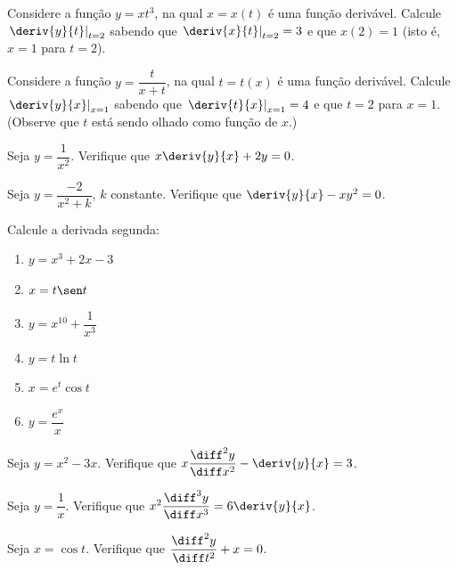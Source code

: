 \begin{exercicio}[4]
Considere a função $y = xt^3$, na qual $x = x(t)$ é uma função derivável. Calcule $\left.\deriv{y}{t}\right|_{t = 2}$ sabendo que $\left.\deriv{x}{t}\right|_{t = 2} = 3$ e que $x(2) = 1$ (isto é, $x = 1$ para $t = 2$).
\end{exercicio}

\begin{exercicio}[5]
Considere a função $y = \dfrac{t}{x + t}$, na qual $t = t(x)$ é uma função derivável. Calcule $\left.\deriv{y}{x}\right|_{x = 1}$ sabendo que $\left.\deriv{t}{x}\right|_{x = 1} = 4$ e que $t = 2$ para $x = 1$. (Observe que $t$ está sendo olhado como função de $x$.)
\end{exercicio}

\begin{exercicio}[6]
Seja $y = \dfrac{1}{x^2}$. Verifique que $x\deriv{y}{x} + 2y = 0$.
\end{exercicio}

\begin{exercicio}[7]
Seja $y = \dfrac{-2}{x^2 + k}$, $k$ constante. Verifique que $\deriv{y}{x} - xy^2 = 0$.
\end{exercicio}

\begin{exercicio}[8]
Calcule a derivada segunda:
\begin{enumerate}[label=\alph*)]
    \item $y = x^3 + 2x - 3$
    \item $x = t \sen t$
    \item $y = x^{10} + \dfrac{1}{x^3}$
    \item $y = t \ln t$
    \item $x = e^t \cos t$
    \item $y = \dfrac{e^x}{x}$
\end{enumerate}
\end{exercicio}

\begin{exercicio}[9]
Seja $y = x^2 - 3x$. Verifique que $x \dfrac{\diff^2 y}{\diff x^2} - \deriv{y}{x} = 3$.
\end{exercicio}

\begin{exercicio}[10]
Seja $y = \dfrac{1}{x}$. Verifique que $x^2 \dfrac{\diff^3 y}{\diff x^3} = 6 \deriv{y}{x}$.
\end{exercicio}

\begin{exercicio}[11]
Seja $x = \cos t$. Verifique que $\dfrac{\diff^2 y}{\diff t^2} + x = 0$.
\end{exercicio}

